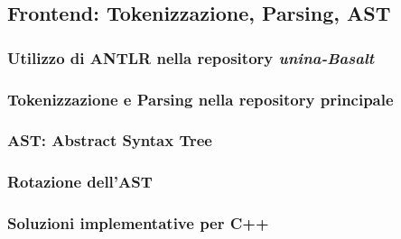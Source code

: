 \subsection{Frontend: Tokenizzazione, Parsing, AST}

\subsubsection{Utilizzo di ANTLR nella repository \textit{unina-Basalt}}
\subsubsection{Tokenizzazione e Parsing nella repository principale}
\subsubsection{AST: Abstract Syntax Tree}
\subsubsection{Rotazione dell'AST}
\subsubsection{Soluzioni implementative per C++}
